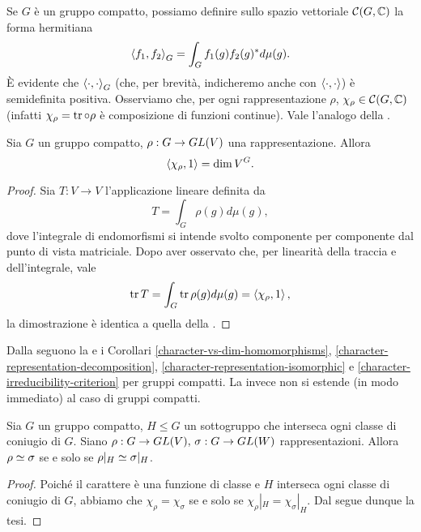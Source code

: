 Se $G$ è un gruppo compatto, possiamo definire sullo spazio vettoriale $\mathcal{C}(G,\mathbb{C})$ la forma hermitiana
$$
\left\langle f_1,f_2\right\rangle_G=\int_Gf_1(g)f_2(g)^*d\mu(g).
$$
È evidente che $\left\langle\cdot,\cdot\right\rangle_G$ (che, per brevità, indicheremo anche con $\left\langle\cdot,\cdot\right\rangle$) è semidefinita positiva. Osserviamo che, per ogni rappresentazione $\rho$, $\chi_\rho\in\mathcal{C}(G,\mathbb{C})$ (infatti $\chi_\rho=\operatorname{tr}\circ\rho$ è composizione di funzioni continue). Vale l'analogo della .
\begin{proposition}
Sia $G$ un gruppo compatto, $\rho:G\to GL(V)$ una rappresentazione. Allora
$$
\left\langle\chi_\rho,1\right\rangle=\dim V^G.
$$
\end{proposition}
\begin{proof}
Sia $T:V\to V$ l'applicazione lineare definita da
$$
T=\int_G\rho(g)d\mu(g),
$$
dove l'integrale di endomorfismi si intende svolto componente per componente dal punto di vista matriciale. Dopo aver osservato che, per linearità della traccia e dell'integrale, vale
$$
\operatorname{tr} T=\int_G\operatorname{tr}\rho(g)d\mu(g)=\left\langle\chi_\rho,1\right\rangle,
$$
la dimostrazione è identica a quella della .
\end{proof}

Dalla  seguono la  e i Corollari \ref{character-vs-dim-homomorphisms}, \ref{character-representation-decomposition}, \ref{character-representation-isomorphic} e \ref{character-irreducibility-criterion} per gruppi compatti. La  invece non si estende (in modo immediato) al caso di gruppi compatti.

\begin{corollary}
Sia $G$ un gruppo compatto, $H\le G$ un sottogruppo che interseca ogni classe di coniugio di $G$. Siano $\rho:G\to GL(V),\,\allowbreak\sigma:G\to GL(W)$ rappresentazioni. Allora $\rho\simeq\sigma$ se e solo se $\rho|_H\simeq\sigma|_H$.
\end{corollary}
\begin{proof}
Poiché il carattere è una funzione di classe e $H$ interseca ogni classe di coniugio di $G$, abbiamo che $\chi_\rho=\chi_\sigma$ se e solo se $\chi_\rho|_H=\chi_\sigma|_H$. Dal  segue dunque la tesi.
\end{proof}



